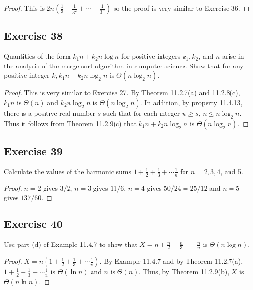 \documentclass[14pt]{extarticle}
\newcommand{\dps}{\displaystyle}
\begin{document}
\begin{proof}
    This is \(\dps 2n \left(\frac{1}{3} + \frac{1}{3^2} + \cdots + \frac{1}{3^n}\right)\) so the proof is very similar to
    Exercise 36.
\end{proof}

\subsection{Exercise 38}
Quantities of the form \(k_1n + k_2n \log n\) for positive integers \(k_1, k_2\), and \(n\) arise in the analysis of the
merge sort algorithm in computer science. Show that for any positive integer \(k, k_1n + k_2n \log_2 n\) is
\(\Theta(n \log_2 n)\).

\begin{proof}
    This is very similar to Exercise 27. By Theorem 11.2.7(a) and 11.2.8(c), \(k_1n\) is \(\Theta(n)\) and \(k_2 n\log_2 n\) is
    \(\Theta(n\log_2 n)\). In addition, by property 11.4.13, there is a positive real number \(s\) such that for each integer
    \(n \geq s\), \(n \leq n\log_2 n\). Thus it follows from Theorem 11.2.9(c) that \(k_1n + k_2 n\log_2 n\) is
    \(\Theta(n \log_2 n)\).
\end{proof}

\subsection{Exercise 39}
Calculate the values of the harmonic sums \(\dps 1 + \frac{1}{2} + \frac{1}{3} + \cdots \frac{1}{n}\) for \(n = 2, 3, 4\),
and 5.

\begin{proof}
    \(n = 2\) gives \(3/2\), \(n = 3\) gives \(11/6\), \(n = 4\) gives \(50/24 = 25/12\) and \(n = 5\) gives \(137/60\).
\end{proof}

\subsection{Exercise 40}
Use part (d) of Example 11.4.7 to show that \(\dps X = n + \frac{n}{2} + \frac{n}{3} + \cdots \frac{n}{n}\) is
\(\Theta(n\log n)\).

\begin{proof}
    \(\dps X = n\left(1 + \frac{1}{2} + \frac{1}{3} + \cdots \frac{1}{n}\right)\). By Example 11.4.7 and by Theorem
    11.2.7(a), \(1 + \frac{1}{2} + \frac{1}{3} + \cdots \frac{1}{n}\) is \(\Theta(\ln n)\) and \(n\) is \(\Theta(n)\).
    Thus, by Theorem 11.2.9(b), \(X\) is \(\Theta(n \ln n)\).
\end{proof}
\end{document}
